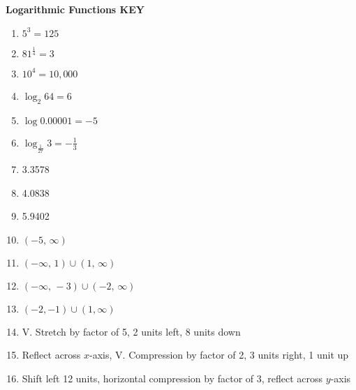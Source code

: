 \documentclass[11pt,a4paper]{exam}
\begin{document}





\newpage


\textbf{Logarithmic Functions KEY}
\begin{enumerate}
    \item $5^3=125$
    \item $81^{\frac{1}{4}}=3$
    \item $10^4=10,000$
    \item $\log_2{64}=6$
    \item $\log{0.00001}=-5$
    \item $\log_{\frac{1}{27}}3=-\frac{1}{3}$
    \item 3.3578
    \item 4.0838
    \item 5.9402
    \item $(-5, \, \infty)$
    \item $(-\infty, \, 1)\cup(1, \, \infty)$
    \item $(-\infty, \, -3)\cup(-2, \, \infty)$
    \item $(-2,-1) \cup (1,\infty)$
    \item V. Stretch by factor of 5, 2 units left, 8 units down
    \item Reflect across $x$-axis, V. Compression by factor of 2, 3 units right, 1 unit up
    \item Shift left 12 units, horizontal compression by factor of 3, reflect across $y$-axis
\end{enumerate}
\end{document}
